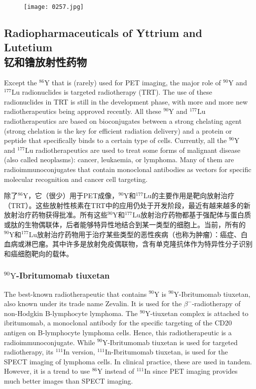 \documentclass[dvipsnames, svgnames,a4paper,11pt]{article}
\begin{document}
\begin{figure}[h]
    \centering
    \texttt{[image: 0257.jpg]}
     \label{fig346}
\end{figure}

\subsection{Radiopharmaceuticals of Yttrium and Lutetium\\ 钇和镥放射性药物}

Except the \(\mathrm{^{86}Y}\) that is (rarely) used for PET imaging, the major role of \(\mathrm{^{90}Y}\) and \(\mathrm{^{177}Lu}\) radionuclides is targeted radiotherapy (TRT). The use of these radionuclides in TRT is still in the development phase, with more and more new radiotherapeutics being approved recently. All these \(\mathrm{^{90}Y}\) and \(\mathrm{^{177}Lu}\) radiotherapeutics are based on bioconjugates between a strong chelating agent (strong chelation is the key for efficient radiation delivery) and a protein or peptide that specifically binds to a certain type of cells. Currently, all the \(\mathrm{^{90}Y}\) and \(\mathrm{^{177}Lu}\) radiotherapeutics are used to treat some forms of malignant disease (also called neoplasms): cancer, leukaemia, or lymphoma. Many of them are radioimmunoconjugates that contain monoclonal antibodies as vectors for specific molecular recognition and cancer cell targeting.

除了\(\mathrm{^{86}Y}\)，它（很少）用于PET成像，\(\mathrm{^{90}Y}\)和\(\mathrm{^{177}Lu}\)的主要作用是靶向放射治疗（TRT）。这些放射性核素在TRT中的应用仍处于开发阶段，最近有越来越多的新放射治疗药物获得批准。所有这些\(\mathrm{^{90}Y}\)和\(\mathrm{^{177}Lu}\)放射治疗药物都基于强配体与蛋白质或肽的生物偶联体，后者能够特异性地结合到某一类型的细胞上。当前，所有的\(\mathrm{^{90}Y}\)和\(\mathrm{^{177}Lu}\)放射治疗药物用于治疗某些类型的恶性疾病（也称为肿瘤）：癌症、白血病或淋巴瘤。其中许多是放射免疫偶联物，含有单克隆抗体作为特异性分子识别和癌细胞靶向的载体。

\subsubsection{\(\mathrm{^{90}Y}\)-Ibritumomab tiuxetan}

The best-known radiotherapeutic that contains \(\mathrm{^{90}Y}\) is \(\mathrm{^{90}Y}\)-Ibritumomab tiuxetan, also known under its trade name Zevalin. It is used for the \(\beta^{-}\)-radiotherapy of non-Hodgkin B-lymphocyte lymphoma. The \(\mathrm{^{90}Y}\)-tiuxetan complex is attached to ibritumomab, a monoclonal antibody for the specific targeting of the CD20 antigen on B-lymphocyte lymphoma cells. Hence, this radiotherapeutic is a radioimmunoconjugate. While \(\mathrm{^{90}Y}\)-Ibritumomab tiuxetan is used for targeted radiotherapy, its \(\mathrm{^{111}In}\) version, \(\mathrm{^{111}In}\)-Ibritumomab tiuxetan, is used for the SPECT imaging of lymphoma cells. In clinical practice, these are used in tandem. However, it is a trend to use \(\mathrm{^{86}Y}\) instead of \(\mathrm{^{111}In}\) since PET imaging provides much better images than SPECT imaging.
\end{document}
